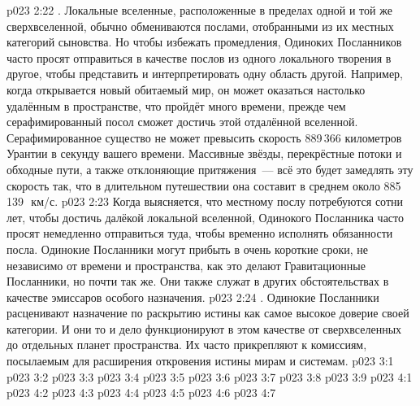 \vs p023 2:22 . Локальные вселенные, расположенные в пределах одной и той же сверхвселенной, обычно обмениваются послами, отобранными из их местных категорий сыновства. Но чтобы избежать промедления, Одиноких Посланников часто просят отправиться в качестве послов из одного локального творения в другое, чтобы представить и интерпретировать одну область другой. Например, когда открывается новый обитаемый мир, он может оказаться настолько удалённым в пространстве, что пройдёт много времени, прежде чем серафимированный посол сможет достичь этой отдалённой вселенной. Серафимированное существо не может превысить скорость 889\,366 километров Урантии в секунду вашего времени. Массивные звёзды, перекрёстные потоки и обходные пути, а также отклоняющие притяжения~--- всё это будет замедлять эту скорость так, что в длительном путешествии она составит в среднем около 885\,139~\,км/с.
\vs p023 2:23 Когда выясняется, что местному послу потребуются сотни лет, чтобы достичь далёкой локальной вселенной, Одинокого Посланника часто просят немедленно отправиться туда, чтобы временно исполнять обязанности посла. Одинокие Посланники могут прибыть в очень короткие сроки, не независимо от времени и пространства, как это делают Гравитационные Посланники, но почти так же. Они также служат в других обстоятельствах в качестве эмиссаров особого назначения.
\vs p023 2:24 . Одинокие Посланники расценивают назначение по раскрытию истины как самое высокое доверие своей категории. И они то и дело функционируют в этом качестве от сверхвселенных до отдельных планет пространства. Их часто прикрепляют к комиссиям, посылаемым для расширения откровения истины мирам и системам.
\vs p023 3:1 
\vs p023 3:2 \pc 
\vs p023 3:3 
\vs p023 3:4 
\vs p023 3:5 \pc 
\vs p023 3:6 
\vs p023 3:7 \pc 
\vs p023 3:8 
\vs p023 3:9 
\vs p023 4:1 
\vs p023 4:2 
\vs p023 4:3 \pc 
\vs p023 4:4 
\vs p023 4:5 \pc 
\vs p023 4:6 
\vsetoff
\vs p023 4:7 
\quizlink
